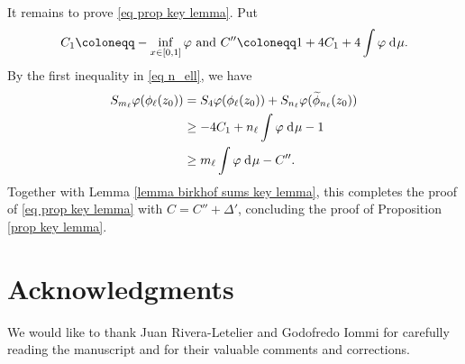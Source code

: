 \documentclass[12pt]{amsart}
\numberwithin{equation}{section} %
\numberwithin{figure}{section} %
\theoremstyle{plain}
\theoremstyle{definition}
\theoremstyle{remark}
\theoremstyle{citing}
\renewcommand{\=}{\coloneqq}
\newcommand{\dd}{\hspace{1pt}\operatorname{d}\hspace{-1pt}}
\begin{document}
It remains to prove \eqref{eq prop key lemma}. Put
\begin{equation}
    C_1\= - \inf_{x\in[0,1]} \varphi \text{ and } C''\= 1 +4C_1 + 4 \int \varphi \dd\mu.
\end{equation}
By the first inequality in \eqref{eq n_ell}, we have
\begin{equation}
\begin{split}
    S_{m_\ell} \varphi (\phi_\ell(z_0)) &= S_4 \varphi (\phi_\ell(z_0)) + S_{n_\ell} \varphi(\widetilde{\phi}_{n_\ell}(z_0))\\
    &\geq -4C_1 + n_\ell \int \varphi \dd\mu - 1\\
    &\geq m_\ell \int \varphi \dd\mu - C''.
    \end{split}
\end{equation}
Together with Lemma \ref{lemma birkhof sums key lemma}, this completes the proof of \eqref{eq prop key lemma} with $C= C'' + \Delta'$, concluding the proof of Proposition \ref{prop key lemma}. 


\section*{Acknowledgments}

We would like to thank Juan Rivera-Letelier and Godofredo Iommi for carefully reading the manuscript and for their valuable comments and corrections.
\end{document}

